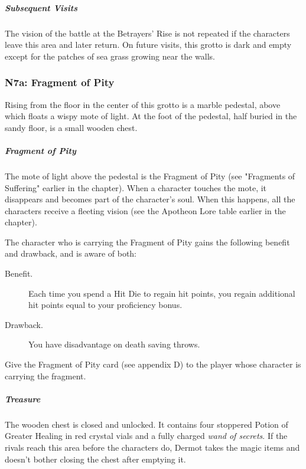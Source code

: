 \documentclass[10pt,a4paper,twoside,fancy,bg=print,twocolumn,openany,nodeprecatedcode]{dndbook}
\begin{document}
\subparagraph{Subsequent Visits}
The vision of the battle at the Betrayers' Rise is not repeated if the characters leave this area and later return. On future visits, this grotto is dark and empty except for the patches of sea grass growing near the walls.

\subsubsection{N7a: Fragment of Pity}
\begin{DndReadAloud}{}
Rising from the floor in the center of this grotto is a marble pedestal, above which floats a wispy mote of light. At the foot of the pedestal, half buried in the sandy floor, is a small wooden chest.

\end{DndReadAloud}

\subparagraph{Fragment of Pity}
The mote of light above the pedestal is the Fragment of Pity (see "Fragments of Suffering" earlier in the chapter). When a character touches the mote, it disappears and becomes part of the character's soul. When this happens, all the characters receive a fleeting vision (see the Apotheon Lore table earlier in the chapter).

The character who is carrying the Fragment of Pity gains the following benefit and drawback, and is aware of both:

\begin{DndSidebar}[float=!b]{}

\begin{description}
\item[Benefit.]
Each time you spend a Hit Die to regain hit points, you regain additional hit points equal to your proficiency bonus.
\item[Drawback.]
You have disadvantage on death saving throws.
\end{description}



\end{DndSidebar}

Give the Fragment of Pity card (see appendix D) to the player whose character is carrying the fragment.

\subparagraph{Treasure}
The wooden chest is closed and unlocked. It contains four stoppered Potion of Greater Healing in red crystal vials and a fully charged \textit{wand of secrets}. If the rivals reach this area before the characters do, Dermot takes the magic items and doesn't bother closing the chest after emptying it.
\end{document}
